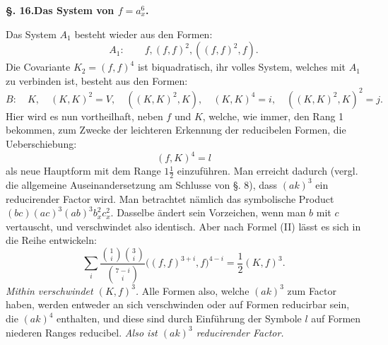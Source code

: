 \documentclass[10pt]{article}
\begin{document}
\begin{center}
{\bfseries §. 16.\quad Das System von $f=a_x^6$.}
\end{center}

Das System $A_1$ besteht wieder aus den Formen:
\[
A_1:
\qquad f,(f,f)^2,((f,f)^2,f).
\]
Die Covariante $K_2=(f,f)^4$ ist biquadratisch, ihr volles System, welches mit $A_1$ zu verbinden ist, besteht aus den Formen:
\[
B:
\quad K,
\quad (K,K)^2=V,
\quad ((K,K)^2,K),
\quad (K,K)^4=i,
\quad ((K,K)^2,K)^2=j.
\]
Hier wird es nun vortheilhaft, neben $f$ und $K$, welche, wie immer, den Rang 1 bekommen, zum Zwecke der leichteren Erkennung der reducibelen Formen, die Ueberschiebung:
\[
(f,K)^4=l
\]
als neue Hauptform mit dem Range $1\frac12$ einzuführen. Man erreicht dadurch (vergl. die allgemeine Auseinandersetzung am Schlusse von §. 8), dass $(ak)^3$ ein reducirender Factor wird. Man betrachtet nämlich das symbolische Product $(bc)(ac)^3(ab)^3b_x^2c_x^2$. Dasselbe ändert sein Vorzeichen, wenn man $b$ mit $c$ vertauscht, und verschwindet also identisch. Aber nach Formel (II) lässt es sich in die Reihe entwickeln:
\[
\sum_i\frac{\binom{1}{i}\binom{3}{i}}{\binom{7-i}{i}}
\bigl((f,f)^{3+i},f\bigr)^{4-i}
=\frac12(K,f)^3.
\]
\textit{Mithin verschwindet $(K,f)^3$.} Alle Formen also, welche $(ak)^3$ zum Factor haben, werden entweder an sich verschwinden oder auf Formen reducirbar sein, die $(ak)^4$ enthalten, und diese sind durch Einführung der Symbole $l$ auf Formen niederen Ranges reducibel. \textit{Also ist $(ak)^3$ reducirender Factor.}
\end{document}
